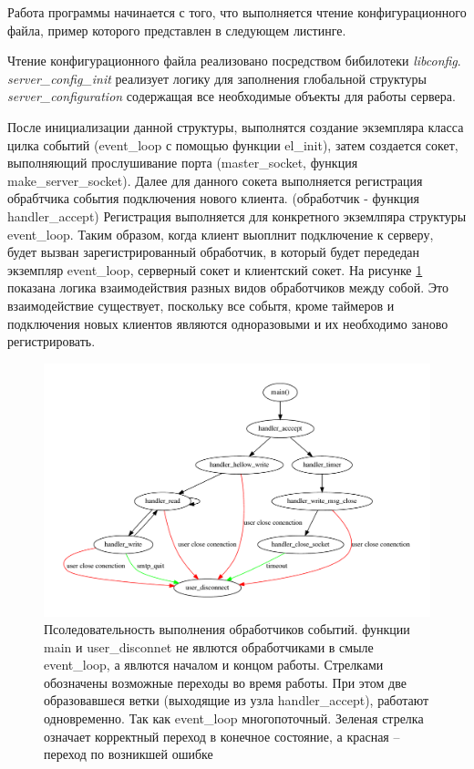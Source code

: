 \documentclass[a4paper,12pt]{report}
\begin{document}
	
	Работа программы начинается с того, что выполняется чтение конфигурационного файла, пример которого представлен в следующем листинге. 


	Чтение конфигурационного файла реализовано посредством бибилотеки \textit{libconfig}. \textit{server\_config\_init} реализует логику для заполнения глобальной структуры \textit{server\_configuration} содержащая все необходимые объекты для работы сервера. 

	 После инициализации данной структуры, выполнятся создание экземпляра класса цилка событий (event\_loop с помощью функции el\_init), затем создается сокет, выполняющий прослушивание порта (master\_socket, функция make\_server\_socket). Далее для данного сокета выполняется регистрация обрабтчика события подключения нового клиента. (обработчик - функция handler\_accept) Регистрация выполняется для конкретного экземлпяра структуры event\_loop. Таким образом, когда клиент выоплнит подключение к серверу, будет вызван зарегистрированный обработчик, в который будет передедан экземпляр event\_loop, серверный сокет и клиентский сокет. На рисунке \ref{fig:handlers} показана логика взаимодействия разных видов обработчиков между собой. Это взаимодействие существует, поскольку все событя, кроме таймеров и подключения новых клиентов являются одноразовыми и их необходимо заново регистрировать.

	 	\begin{figure}[H]
		\centering
		\includegraphics[width=\textwidth]{./resource/handlers.pdf}
		\caption{Псоледовательность выполнения обработчиков событий. функции main и user\_disconnet не явлются обработчиками в смыле event\_loop, а явлются началом и концом работы.  Стрелками обозначены возможные переходы во время работы. При этом две образовавшеся ветки (выходящие из узла handler\_accept), работают одновременно. Так как event\_loop многопоточный. Зеленая стрелка означает корректный переход в конечное состояние, а красная -- переход по возникшей ошибке} \label{fig:handlers}
	\end{figure}
\end{document}

